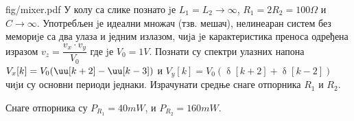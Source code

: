 \begin{slikaDesno}[0.83]{fig/mixer.pdf}
    \PID 
    У колу са слике познато jе $L_1 = L_2 \to \infty$, 
    $R_1 = 2 R_2 = 100\unit{\Omega}$ и 
    $C \to \infty$. 
    Употребљен jе идеални множач (тзв. мешач), нелинеаран систем без мемориjе са два улаза и једним излазом,
    чиjа jе карактеристика преноса одређена изразом 
    $v_z = \dfrac{v_x \cdot v_y}{V_0}$
    где jе $V_0 = 1\unit{V}$. 
    Познати су спектри улазних напона 
    $V_x[k] = V_0 (\uu[k + 2] - \uu[k - 3])$ и
    $V_y[k] = V_0 (\updelta[k + 2] + \updelta[k - 2])$ чиjи су основни
    периоди једнаки. Израчунати средње снаге отпорника $R_1$ и $R_2$.
\end{slikaDesno}

\REZULTAT Снаге отпорника су 
$P_{R_1} = 40\unit{mW}$, и 
$P_{R_2} = 160\unit{mW}$.